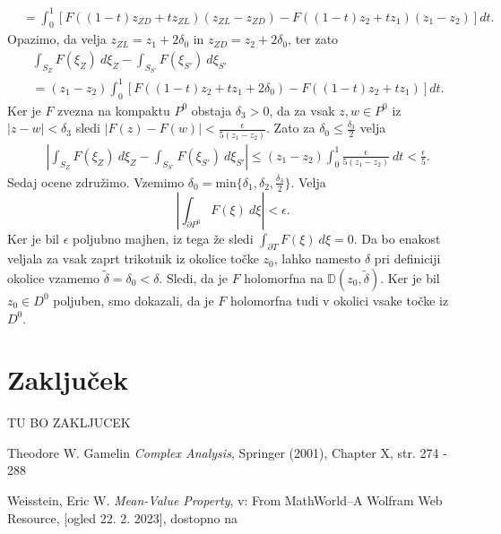 \documentclass[mat1, tisk]{fmfdelo}
\begin{document}
\begin{dokaz}
\begin{align*}
            &=\int_{0}^{1}{\left[F((1 -t)z_{ZD} + t z_{ZL})(z_{ZL} - z_{ZD}) - F((1 -t)z_{2} + t z_{1})(z_{1} - z_{2})\right]dt}.
        \end{align*}  
        Opazimo, da velja $z_{ZL} = z_{1} + 2 \delta_0$ in $z_{ZD} = z_2 + 2 \delta_0$, ter zato
        \begin{align*}
            &\int_{S_Z}{F(\xi_Z)~d\xi_Z} - \int_{S_{S'}}{F(\xi_{S'})~d\xi_{S'}}\\
            &=(z_{1} - z_{2})\int_{0}^{1}{\left[F((1 -t)z_{2} + t z_{1} + 2 \delta_0) - F((1 -t)z_{2} + t z_{1})\right]dt}.
        \end{align*}  
        Ker je $F$ zvezna na kompaktu $P^0$ obstaja $\delta_3 >0$, da za vsak $z, w \in P^0$ iz $|z -w| < \delta_3$ sledi $|F(z) - F(w)| < \frac{\epsilon}{5(z_1 - z_2)}$.
        Zato za $\delta_0 \leq \frac{\delta_3}{2}$ velja
        \begin{align*}
            &\left|\int_{S_Z}{F(\xi_Z)~d\xi_Z} - \int_{S_{S'}}{F(\xi_{S'})~d\xi_{S'}}\right|
            \leq (z_{1} - z_{2})\int_{0}^{1}{\frac{\epsilon}{5(z_{1} - z_{2})}~dt} < \frac{\epsilon}{5}.
        \end{align*}  
        Sedaj ocene združimo. Vzemimo $\delta_0 = \text{min}\{\delta_1, \delta_2, \frac{\delta_3}{2}\}$. Velja
        $$ 
        \left|\int_{\partial P^0}{F(\xi)~d\xi}\right|< \epsilon.
        $$
        Ker je bil $\epsilon$ poljubno majhen, iz tega že sledi $\int_{\partial T}{F(\xi)~d\xi} = 0$. 
        Da bo enakost veljala za vsak zaprt trikotnik iz okolice točke $z_0$, lahko namesto $\delta$ pri definiciji okolice vzamemo $\widetilde{\delta} = \delta_0 < \delta$. 
        Sledi, da je $F$ holomorfna na $\mathbb{D}(z_0, \widetilde{\delta})$. Ker je bil $z_0 \in D^0$ poljuben, smo dokazali, da je $F$ holomorfna tudi v okolici vsake točke iz $D^0$. 
    \end{dokaz}

\section{Zaključek}
    TU BO ZAKLJUCEK


\begin{thebibliography}{9}
    Theodore W. Gamelin \emph{Complex Analysis}, Springer (2001), Chapter X, str. 274 - 288

    Weisstein, Eric W. \emph{Mean-Value Property}, v: From MathWorld--A Wolfram Web Resource, [ogled 22. 2. 2023], dostopno na
\end{thebibliography}
\end{document}
